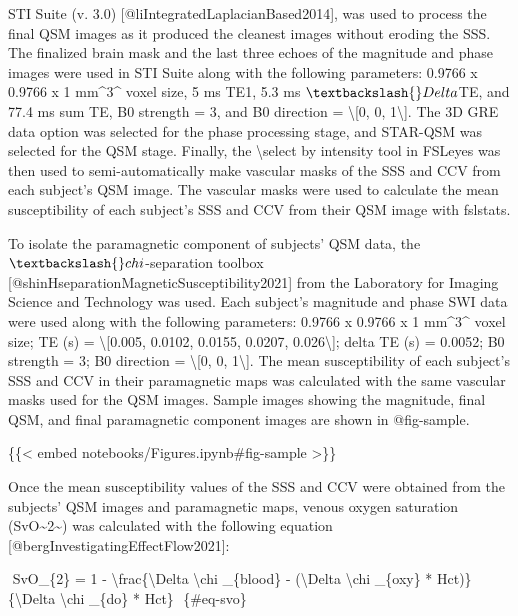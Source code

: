 \documentclass[
  letterpaper,
  DIV=11,
  numbers=noendperiod]{scrartcl}
\newenvironment{Shaded}{\begin{snugshade}}{\end{snugshade}}
\newcommand{\NormalTok}[1]{\textcolor[rgb]{0.00,0.23,0.31}{#1}}
\begin{document}
\begin{Shaded}
\begin{Highlighting}[]
\NormalTok{STI Suite (v. 3.0) [@liIntegratedLaplacianBased2014], was used to process the final QSM images as it produced the cleanest images without eroding the SSS. The finalized brain mask and the last three echoes of the magnitude and phase images were used in STI Suite along with the following parameters: 0.9766 x 0.9766 x 1 mm\^{}3\^{} voxel size, 5 ms TE1, 5.3 ms $\textbackslash{}Delta$TE, and 77.4 ms sum TE, B0 strength = 3, and B0 direction = \textbackslash{}[0, 0, 1\textbackslash{}]. The 3D GRE data option was selected for the phase processing stage, and STAR{-}QSM was selected for the QSM stage. Finally, the \textbackslash{}\textasciigrave{}select by intensity\textquotesingle{} tool in \textasciigrave{}FSLeyes\textasciigrave{} was then used to semi{-}automatically make vascular masks of the SSS and CCV from each subject’s QSM image. The vascular masks were used to calculate the mean susceptibility of each subject’s SSS and CCV from their QSM image with \textasciigrave{}fslstats\textasciigrave{}.}

\NormalTok{To isolate the paramagnetic component of subjects’ QSM data, the $\textbackslash{}chi${-}separation toolbox [@shinHseparationMagneticSusceptibility2021] from the Laboratory for Imaging Science and Technology was used. Each subject’s magnitude and phase SWI data were used along with the following parameters: 0.9766 x 0.9766 x 1 mm\^{}3\^{} voxel size; TE (s) = \textbackslash{}[0.005, 0.0102, 0.0155, 0.0207, 0.026\textbackslash{}]; delta TE (s) = 0.0052; B0 strength = 3; B0 direction = \textbackslash{}[0, 0, 1\textbackslash{}]. The mean susceptibility of each subject’s SSS and CCV in their paramagnetic maps was calculated with the same vascular masks used for the QSM images. Sample images showing the magnitude, final QSM, and final paramagnetic component images are shown in @fig{-}sample.}

\NormalTok{\{\{\textless{} embed notebooks/Figures.ipynb\#fig{-}sample \textgreater{}\}\}}

\NormalTok{Once the mean susceptibility values of the SSS and CCV were obtained from the subjects’ QSM images and paramagnetic maps, venous oxygen saturation (SvO\textasciitilde{}2\textasciitilde{}) was calculated with the following equation [@bergInvestigatingEffectFlow2021]:}

\NormalTok{$$}
\NormalTok{SvO\_\{2\} = 1 {-} \textbackslash{}frac\{\textbackslash{}Delta \textbackslash{}chi \_\{blood\} {-} (\textbackslash{}Delta \textbackslash{}chi \_\{oxy\} * Hct)\}\{\textbackslash{}Delta \textbackslash{}chi \_\{do\} * Hct\}}
\NormalTok{$$ \{\#eq{-}svo\}}


\end{Highlighting}
\end{Shaded}
\end{document}
